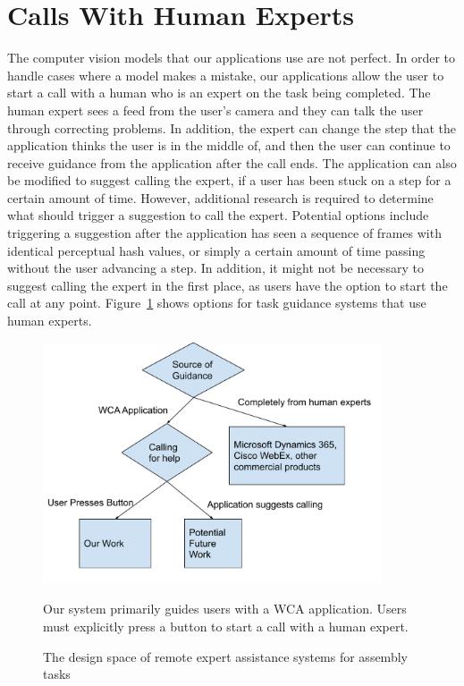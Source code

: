 \section{Calls With Human Experts}

The computer vision models that our applications use are not perfect. In order
to handle cases where a model makes a mistake, our applications allow the user
to start a call with a human who is an expert on the task being completed. The
human expert sees a feed from the user's camera and they can talk the user
through correcting problems. In addition, the expert can change the step that
the application thinks the user is in the middle of, and then the user can
continue to receive guidance from the application after the call ends.
The application can also be modified to suggest calling the expert, if a user
has been stuck on a step for a certain amount of time.
However, additional research is required to determine what should trigger a
suggestion to call the expert.
Potential options include triggering a suggestion after the application has seen
a sequence of frames with identical perceptual hash
values, or simply a certain amount of time passing without the user advancing a
step.
In addition, it might not be necessary to suggest calling the expert in the
first place, as users have the option to start the call at any point.
Figure~\ref{fig:design_space} shows options for task guidance systems that use
human experts.

\begin{figure}[h]
  \includegraphics[width=10cm]{figures/design_space.pdf}
  \begin{captiontext}
    Our system primarily guides users with a WCA application.
    Users must explicitly press a button to start a call with a human expert.
  \end{captiontext}
  \caption{
    The design space of remote expert assistance systems for assembly tasks
  }\label{fig:design_space}
\end{figure}

